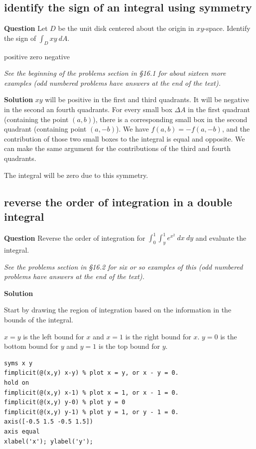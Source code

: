 \documentclass[12pt,letterpaper,noanswers]{exam}
\begin{document}
\subsection{identify the sign of an integral using symmetry}
\noindent\textbf{Question}
Let $D$ be the unit disk centered about the origin in $xy$-space.  Identify the sign of $\int_D xy\ dA$.
\begin{oneparcheckboxes}
\choice positive
\choice zero
\choice negative
\end{oneparcheckboxes}

\emph{See the beginning of the problems section in \S 16.1 for about sixteen more examples (odd numbered problems have answers at the end of the text).}


\noindent\textbf{Solution}
$xy$ will be positive in the first and third quadrants.  It will be negative in the second an fourth quadrants.  For every small box $\Delta A$ in the first quadrant (containing the point $(a,b)$), there is a corresponding small box in the second quadrant (containing point $(a,-b)$).  We have $f(a,b) = -f(a,-b)$, and the contribution of those two small boxes to the integral is equal and opposite.  We can make the same argument for the contributions of the third and fourth quadrants.

The integral will be zero due to this symmetry.

\subsection{reverse the order of integration in a double integral}
\noindent\textbf{Question}
Reverse the order of integration for $\displaystyle\int_0^1\int_y^1 e^{x^2}\ dx\ dy$ and evaluate the integral.

\emph{See the problems section in \S 16.2 for six or so examples of this (odd numbered problems have answers at the end of the text).}

\noindent\textbf{Solution}

Start by drawing the region of integration based on the information in the bounds of the integral.

$x=y$ is the left bound for $x$ and $x=1$ is the right bound for $x$.  $y = 0$ is the bottom bound for $y$ and $y = 1$ is the top bound for $y$.

\begin{lstlisting}
syms x y
fimplicit(@(x,y) x-y) % plot x = y, or x - y = 0.
hold on
fimplicit(@(x,y) x-1) % plot x = 1, or x - 1 = 0.
fimplicit(@(x,y) y-0) % plot y = 0
fimplicit(@(x,y) y-1) % plot y = 1, or y - 1 = 0.
axis([-0.5 1.5 -0.5 1.5])
axis equal
xlabel('x'); ylabel('y');
\end{lstlisting}
\end{document}
